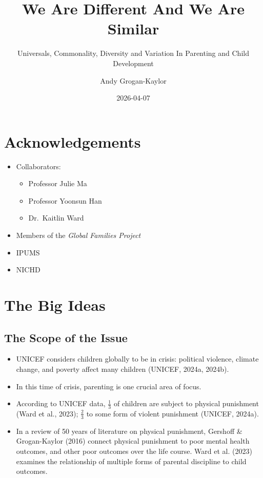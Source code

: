 \documentclass[
  letterpaper,
  DIV=11,
  numbers=noendperiod]{scrartcl}
\title{We Are Different And We Are Similar}
\subtitle{Universals, Commonality, Diversity and Variation In Parenting
and Child Development}
\author{Andy Grogan-Kaylor}
\date{2026-04-07}
\providecommand{\tightlist}{%
  \setlength{\itemsep}{0pt}\setlength{\parskip}{0pt}}
\renewcommand*\contentsname{Table of contents}
\newcommand\contentsname{Table of contents}
\begin{document}
\maketitle

\renewcommand*\contentsname{Table of contents}
{
\setcounter{tocdepth}{3}
\tableofcontents
}

\section{Acknowledgements}\label{acknowledgements}

\begin{itemize}
\tightlist
\item
  Collaborators:

  \begin{itemize}
  \tightlist
  \item
    Professor Julie Ma
  \item
    Professor Yoonsun Han
  \item
    Dr.~Kaitlin Ward
  \end{itemize}
\item
  Members of the \emph{Global Families Project}
\item
  IPUMS
\item
  NICHD
\end{itemize}

\section{The Big Ideas}\label{the-big-ideas}

\subsection{The Scope of the Issue}\label{the-scope-of-the-issue}

\begin{itemize}
\tightlist
\item
  UNICEF considers children globally to be in {crisis}: political
  violence, climate change, and poverty affect many children (UNICEF,
  2024a, 2024b).
\item
  In this time of crisis, {parenting} is one crucial area of focus.
\item
  According to UNICEF data, {\(\frac{1}{3}\) of children are subject to
  physical punishment} (Ward et al., 2023); {\(\frac{2}{3}\) to some
  form of violent punishment} (UNICEF, 2024a).
\item
  In a review of 50 years of literature on physical punishment, Gershoff
  \& Grogan-Kaylor (2016) {connect physical punishment to poor mental
  health outcomes}, and other poor outcomes over the life course. Ward
  et al. (2023) examines the {relationship of multiple forms of parental
  discipline to child outcomes}.
\end{itemize}
\end{document}
